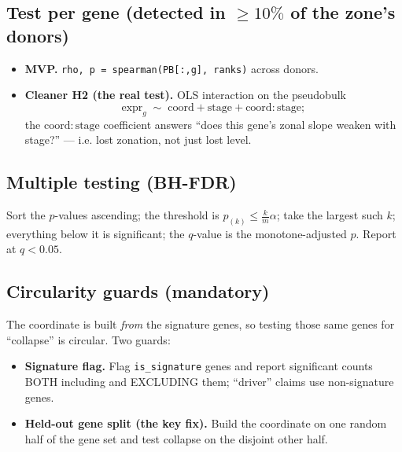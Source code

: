 \documentclass[11pt]{article}
\newcommand{\code}[1]{\texttt{\small #1}}
\newcommand{\coordc}{\mathrm{coord}}
\begin{document}
\subsection{Test per gene (detected in $\ge 10\%$ of the zone's donors)}
\begin{itemize}[leftmargin=1.4em]
  \item \textbf{MVP.} \code{rho, p = spearman(PB[:,g], ranks)} across donors.
  \item \textbf{Cleaner H2 (the real test).} OLS interaction on the pseudobulk
        \[
          \text{expr}_g \;\sim\; \coordc + \text{stage} + \coordc{:}\text{stage};
        \]
        the $\coordc{:}\text{stage}$ coefficient answers ``does this gene's zonal slope weaken with
        stage?'' --- i.e. lost zonation, not just lost level.
\end{itemize}

\subsection{Multiple testing (BH-FDR)}
Sort the $p$-values ascending; the threshold is $p_{(k)} \le \frac{k}{m}\alpha$; take the largest
such $k$; everything below it is significant; the $q$-value is the monotone-adjusted $p$. Report at
$q < 0.05$.

\subsection{Circularity guards (mandatory)}
The coordinate is built \emph{from} the signature genes, so testing those same genes for
``collapse'' is circular. Two guards:
\begin{itemize}[leftmargin=1.4em]
  \item \textbf{Signature flag.} Flag \code{is\_signature} genes and report significant counts
        BOTH including and EXCLUDING them; ``driver'' claims use non-signature genes.
  \item \textbf{Held-out gene split (the key fix).} Build the coordinate on one random half of the
        gene set and test collapse on the disjoint other half.
\end{itemize}
\end{document}
